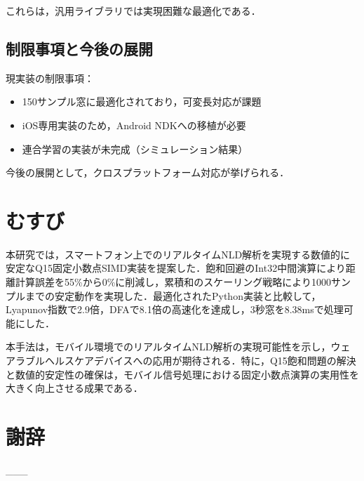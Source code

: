 \documentclass[paper]{ieice}
\begin{document}
これらは，汎用ライブラリでは実現困難な最適化である．

\subsection{制限事項と今後の展開}

現実装の制限事項：
\begin{itemize}
\item 150サンプル窓に最適化されており，可変長対応が課題
\item iOS専用実装のため，Android NDKへの移植が必要
\item 連合学習の実装が未完成（シミュレーション結果）
\end{itemize}

今後の展開として，クロスプラットフォーム対応が挙げられる．

\section{むすび}

本研究では，スマートフォン上でのリアルタイムNLD解析を実現する数値的に安定なQ15固定小数点SIMD実装を提案した．飽和回避のInt32中間演算により距離計算誤差を55\%から0\%に削減し，累積和のスケーリング戦略により1000サンプルまでの安定動作を実現した．最適化されたPython実装と比較して，Lyapunov指数で2.9倍，DFAで8.1倍の高速化を達成し，3秒窓を8.38msで処理可能にした．

本手法は，モバイル環境でのリアルタイムNLD解析の実現可能性を示し，ウェアラブルヘルスケアデバイスへの応用が期待される．特に，Q15飽和問題の解決と数値的安定性の確保は，モバイル信号処理における固定小数点演算の実用性を大きく向上させる成果である．

\section*{謝辞}
___
\end{document}
